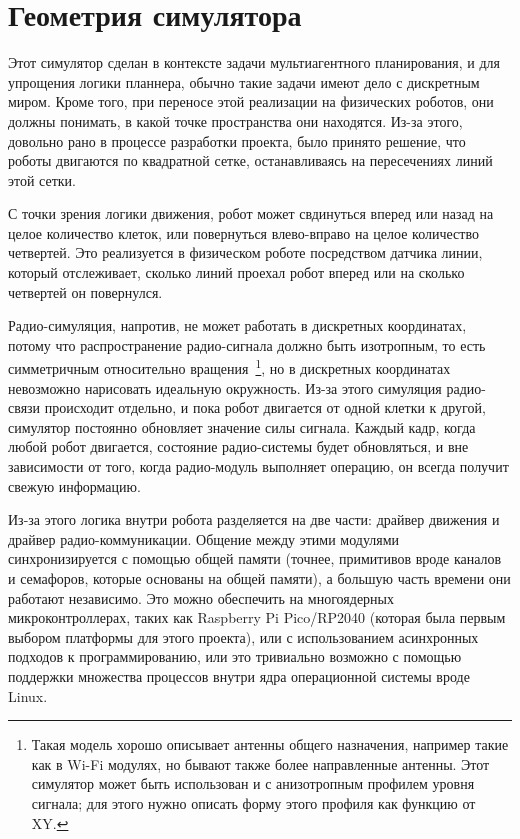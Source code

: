 \documentclass[%
]{report}
\begin{document}
\section{Геометрия симулятора}

Этот симулятор сделан в контексте задачи мультиагентного планирования,
и для упрощения логики планнера,
обычно такие задачи имеют дело с дискретным миром.
Кроме того, при переносе этой реализации на физических роботов,
они должны понимать,
в какой точке пространства они находятся.
Из-за этого, довольно рано в процессе разработки проекта, было принято решение,
что роботы двигаются по квадратной сетке,
останавливаясь на пересечениях линий этой сетки.

С точки зрения логики движения, робот может свдинуться вперед или назад на целое количество клеток,
или повернуться влево-вправо на целое количество четвертей.
Это реализуется в физическом роботе посредством датчика линии,
который отслеживает, сколько линий проехал робот вперед
или на сколько четвертей он повернулся.

Радио-симуляция, напротив, не может работать в дискретных координатах,
потому что распространение радио-сигнала должно быть изотропным,
то есть симметричным относительно вращения~\footnote{Такая модель хорошо описывает антенны общего назначения,
например такие как в Wi-Fi модулях,
но бывают также более направленные антенны.
Этот симулятор может быть использован и с анизотропным профилем уровня сигнала;
для этого нужно описать форму этого профиля как функцию от XY.},
но в дискретных координатах невозможно нарисовать идеальную окружность.
Из-за этого симуляция радио-связи происходит отдельно,
и пока робот двигается от одной клетки к другой,
симулятор постоянно обновляет значение силы сигнала.
Каждый кадр, когда любой робот двигается,
состояние радио-системы будет обновляться,
и вне зависимости от того,
когда радио-модуль выполняет операцию,
он всегда получит свежую информацию.

Из-за этого логика внутри робота разделяется на две части: 
драйвер движения и драйвер радио-коммуникации.
Общение между этими модулями синхронизируется с помощью общей памяти (точнее, примитивов вроде каналов и семафоров, которые основаны на общей памяти),
а большую часть времени они работают независимо.
Это можно обеспечить на многоядерных микроконтроллерах,
таких как Raspberry Pi Pico/RP2040 (которая была первым выбором платформы для этого проекта),
или с использованием асинхронных подходов к программированию,
или это тривиально возможно с помощью поддержки множества процессов внутри ядра операционной системы вроде Linux.
\end{document}
